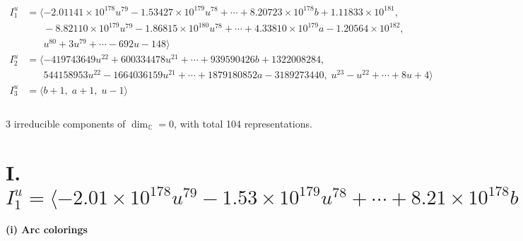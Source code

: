 \documentclass[1p]{elsarticle_modified}
\theoremstyle{definition}
\begin{document}
\begin{align*}
I^u_{1}&=\langle 
-2.01141\times10^{178} u^{79}-1.53427\times10^{179} u^{78}+\cdots+8.20723\times10^{178} b+1.11833\times10^{181},\\
\phantom{I^u_{1}}&\phantom{= \langle  }-8.82110\times10^{179} u^{79}-1.86815\times10^{180} u^{78}+\cdots+4.33810\times10^{179} a-1.20564\times10^{182},\\
\phantom{I^u_{1}}&\phantom{= \langle  }u^{80}+3 u^{79}+\cdots-692 u-148\rangle \\
I^u_{2}&=\langle 
-419743649 u^{22}+600334478 u^{21}+\cdots+939590426 b+1322008284,\\
\phantom{I^u_{2}}&\phantom{= \langle  }544158953 u^{22}-1664036159 u^{21}+\cdots+1879180852 a-3189273440,\;u^{23}- u^{22}+\cdots+8 u+4\rangle \\
I^u_{3}&=\langle 
b+1,\;a+1,\;u-1\rangle \\
\\
\end{align*}
\raggedright * 3 irreducible components of $\dim_{\mathbb{C}}=0$, with total 104 representations.\\
\newpage
\renewcommand{\arraystretch}{1}
\centering \section*{I. $I^u_{1}= \langle -2.01\times10^{178} u^{79}-1.53\times10^{179} u^{78}+\cdots+8.21\times10^{178} b+1.12\times10^{181},\;-8.82\times10^{179} u^{79}-1.87\times10^{180} u^{78}+\cdots+4.34\times10^{179} a-1.21\times10^{182},\;u^{80}+3 u^{79}+\cdots-692 u-148 \rangle$}
\flushleft \textbf{(i) Arc colorings}\\
\end{document}
